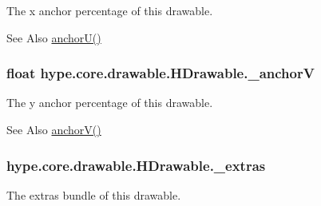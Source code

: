 The x anchor percentage of this drawable. 

\begin{DoxySeeAlso}{See Also}
\hyperlink{classhype_1_1core_1_1drawable_1_1_h_drawable_add9181ba6883afc4a2a4a02a09c7b03f}{anchor\-U()} 
\end{DoxySeeAlso}
\hypertarget{classhype_1_1core_1_1drawable_1_1_h_drawable_aeb7e6b74ab55ac95fd49d86a4fce5d48}{
\subsubsection[{\-\_\-anchor\-V}]{\setlength{\rightskip}{0pt plus 5cm}float hype.\-core.\-drawable.\-H\-Drawable.\-\_\-anchor\-V\hspace{0.3cm}{\ttfamily [protected]}}}\label{classhype_1_1core_1_1drawable_1_1_h_drawable_aeb7e6b74ab55ac95fd49d86a4fce5d48}


The y anchor percentage of this drawable. 

\begin{DoxySeeAlso}{See Also}
\hyperlink{classhype_1_1core_1_1drawable_1_1_h_drawable_a55098c318cbf8952341267c84451e513}{anchor\-V()} 
\end{DoxySeeAlso}
\hypertarget{classhype_1_1core_1_1drawable_1_1_h_drawable_a1a8ae31b67c5adc319cd8108b16171fe}{
\subsubsection[{\-\_\-extras}]{ hype.\-core.\-drawable.\-H\-Drawable.\-\_\-extras\hspace{0.3cm}{\ttfamily [protected]}}}\label{classhype_1_1core_1_1drawable_1_1_h_drawable_a1a8ae31b67c5adc319cd8108b16171fe}


The extras bundle of this drawable. 

